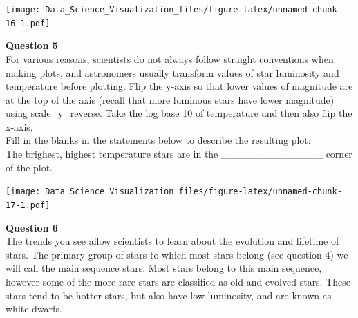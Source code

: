 \documentclass[
]{article}
\newenvironment{Shaded}{\begin{snugshade}}{\end{snugshade}}
\newcommand{\DataTypeTok}[1]{\textcolor[rgb]{0.13,0.29,0.53}{#1}}
\newcommand{\KeywordTok}[1]{\textcolor[rgb]{0.13,0.29,0.53}{\textbf{#1}}}
\newcommand{\NormalTok}[1]{#1}
\newcommand{\OperatorTok}[1]{\textcolor[rgb]{0.81,0.36,0.00}{\textbf{#1}}}
\newcommand{\StringTok}[1]{\textcolor[rgb]{0.31,0.60,0.02}{#1}}
\begin{document}
\begin{Shaded}
\end{Shaded}

\texttt{[image: Data\_Science\_Visualization\_files/figure-latex/unnamed-chunk-16-1.pdf]}

\textbf{Question 5}\\
For various reasons, scientists do not always follow straight
conventions when making plots, and astronomers usually transform values
of star luminosity and temperature before plotting. Flip the y-axis so
that lower values of magnitude are at the top of the axis (recall that
more luminous stars have lower magnitude) using scale\_y\_reverse. Take
the log base 10 of temperature and then also flip the x-axis.\\
Fill in the blanks in the statements below to describe the resulting
plot:\\
The brighest, highest temperature stars are in the
\_\_\_\_\_\_\_\_\_\_\_\_\_\_ corner of the plot.

\begin{Shaded}
\end{Shaded}

\texttt{[image: Data\_Science\_Visualization\_files/figure-latex/unnamed-chunk-17-1.pdf]}

\textbf{Question 6}\\
The trends you see allow scientists to learn about the evolution and
lifetime of stars. The primary group of stars to which most stars belong
(see question 4) we will call the main sequence stars. Most stars belong
to this main sequence, however some of the more rare stars are
classified as old and evolved stars. These stars tend to be hotter
stars, but also have low luminosity, and are known as white dwarfs.
\end{document}
